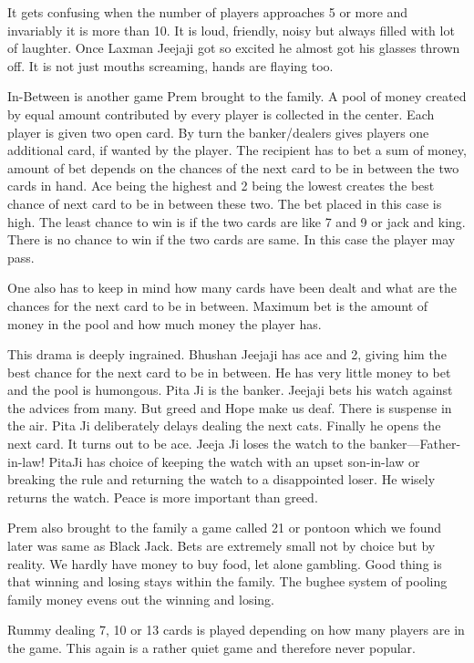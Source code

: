 It gets confusing when the number of players approaches 5 or more and
invariably it is more than 10. It is loud, friendly, noisy but always
filled with lot of laughter. Once Laxman Jeejaji got so excited he almost
got his glasses thrown off. It is not just mouths screaming, hands are
flaying too. 

In-Between is another game Prem brought to the family. A pool of money
created by equal amount contributed by every player is collected in the
center. Each player is given two open card. By turn the banker/dealers
gives players one additional card, if wanted by the player. The recipient
has to bet a sum of money, amount of bet depends on the chances of the
next card to be in between the two cards in hand. Ace being the highest
and 2 being the lowest creates the best chance of next card to be in
between these two. The bet placed in this case  is high. The least chance
to win is if the two cards are like 7 and 9 or jack and king. There is no
chance to win if the two cards are same. In this case the player may pass. 

One also has to keep in mind how many cards have been dealt and what are
the chances for the next card to be in between. Maximum bet is the amount
of money in the pool and how much money the player has. 

This drama is deeply ingrained. Bhushan Jeejaji has ace and 2, giving him
the best chance for the next card to be in between. He has very little
money to bet and the pool is humongous. Pita Ji is the banker. Jeejaji
bets his watch against the advices from many. But greed and Hope make us
deaf. There is suspense in the air. Pita Ji deliberately delays dealing
the next cats. Finally he opens the next card. It turns out to be ace.
Jeeja Ji loses the watch to the banker—Father-in-law! PitaJi has choice of
keeping the watch with an upset son-in-law or breaking the rule and
returning the watch to a disappointed loser. He wisely returns the watch.
Peace is more important than greed. 

Prem also brought to the family a game called 21 or  pontoon which we
found later was same as Black Jack. Bets are extremely small not by choice
but by reality. We hardly have money to buy food, let alone gambling. Good
thing is that winning and losing stays within the family. The bughee
system of pooling family money evens out the winning and losing. 

Rummy dealing 7, 10 or 13 cards is played depending on how many players
are in the game. This again is a rather quiet game and therefore never
popular. 

